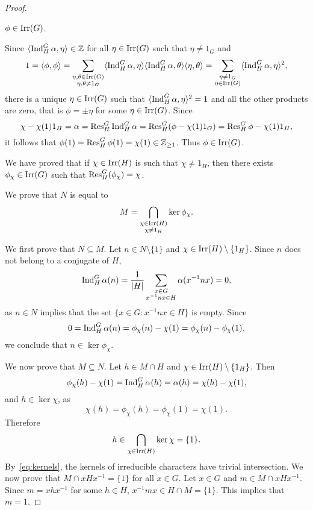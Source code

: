 \begin{proof}
  \begin{claim}
  $\phi\in\operatorname{Irr}(G)$.
  \end{claim}
  
  Since $\langle\operatorname{Ind}_H^G\alpha,\eta\rangle\in\mathbb{Z}$ for all $\eta\in\operatorname{Irr}(G)$ such that 
  $\eta\ne 1_G$ and 
  \[
  1=\langle\phi,\phi\rangle
  =\sum_{\substack{\eta,\theta\in\operatorname{Irr}(G)\\\eta,\theta\ne1_G}}\langle\operatorname{Ind}_H^G\alpha,\eta\rangle\langle\operatorname{Ind}_H^G\alpha,\theta\rangle\langle\eta,\theta\rangle
  =\sum_{\substack{\eta\ne 1_G\\\eta\in\operatorname{Irr}(G)}}\langle\operatorname{Ind}_H^G\alpha,\eta\rangle^2,
  \]
  there is a unique $\eta\in\operatorname{Irr}(G)$ such that 
  $\langle\operatorname{Ind}_H^G\alpha,\eta\rangle^2=1$ and all the other products are zero, 
  that is 
  $\phi=\pm\eta$ for some $\eta\in\operatorname{Irr}(G)$. Since 
  \[
  \chi-\chi(1)1_H=\alpha=\operatorname{Res}_H^G\operatorname{Ind}_H^G\alpha=\operatorname{Res}_H^G(\phi-\chi(1)1_G)=\operatorname{Res}_H^G\phi-\chi(1)1_H,
  \]
  it follows that $\phi(1)=\operatorname{Res}_H^G\phi(1)=\chi(1)\in\mathbb{Z}_{\geq1}$. Thus $\phi\in\operatorname{Irr}(G)$. 

  \medskip
  We have proved that if $\chi\in\operatorname{Irr}(H)$ is such that $\chi\ne 1_H$, then 
  there exists $\phi_\chi\in\operatorname{Irr}(G)$ such that $\operatorname{Res}_H^G(\phi_\chi)=\chi$. 
  
  \medskip
  We prove that $N$ is equal to 
  \[
	M=\bigcap_{\substack{\chi\in\operatorname{Irr}(H)\\\chi\ne1_H}}\ker\phi_{\chi}.
  \]

  We first prove that $N\subseteq M$. 
  Let $n\in N\setminus\{1\}$ and $\chi\in\operatorname{Irr}(H)\setminus\{1_H\}$. Since $n$ 
  does not belong to a conjugate of 
  $H$, 
  \[
	\operatorname{Ind}_H^G\alpha(n)=\frac{1}{|H|}\sum_{\substack{x\in G\\x^{-1}nx\in H}}\alpha(x^{-1}nx)=0, 
  \]
  as $n\in N$ implies that the set $\{x\in G:x^{-1}nx\in H\}$ is empty. Since 
  \[
  0=\operatorname{Ind}_H^G\alpha(n)
  =\phi_{\chi}(n)-\chi(1)=\phi_{\chi}(n)-\phi_{\chi}(1),
  \]
  we conclude that $n\in\ker\phi_{\chi}$. 
  
  We now prove that $M\subseteq N$. 
  Let $h\in M\cap H$ and $\chi\in\operatorname{Irr}(H)\setminus\{1_H\}$. Then 
  \[
    \phi_{\chi}(h)-\chi(1)=\operatorname{Ind}_H^G\alpha(h)=\alpha(h)=\chi(h)-\chi(1),
  \]
  and $h\in\ker\chi$, as
  \[
    \chi(h)=\phi_{\chi}(h)=\phi_{\chi}(1)=\chi(1).
  \]
  Therefore 
  \[
  h\in\bigcap_{\chi\in\operatorname{Irr}(H)}\ker\chi=\{1\}.
  \]
  By~\eqref{eq:kernels}, the kernels
  of irreducible characters have trivial intersection. 
  We now prove that $M\cap
  xHx^{-1}=\{1\}$ for all $x\in G$. Let $x\in G$ and $m\in M\cap xHx^{-1}$. Since 
  $m=xhx^{-1}$ for some $h\in H$, $x^{-1}mx\in H\cap M=\{1\}$.  This implies that 
  $m=1$.
\end{proof}

